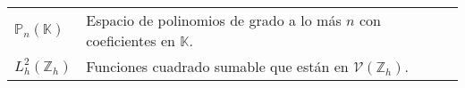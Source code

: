 \begin{tabular}{L{1.5 cm}p{12.5 cm}}
    $\mathbb{P}_{n}\left(\mathbb{K}\right)$ & Espacio de polinomios de grado a lo más $n$ con coeficientes en $\mathbb{K}$.                \\
    $L^{2}_{h}\left(\mathbb{Z}_{h}\right)$  & Funciones cuadrado sumable que están en $\mathcal{V}\left(\mathbb{Z}_{h}\right)$.
\end{tabular}

